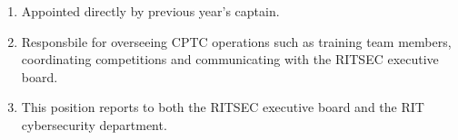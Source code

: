 
\begin{enumerate}
      \item Appointed directly by previous year's captain.
      \item Responsbile for overseeing CPTC operations such as training team 
            members, coordinating competitions and communicating with the 
            RITSEC executive board.
      \item This position reports to both the RITSEC executive board and the
            RIT cybersecurity department.
\end{enumerate}
